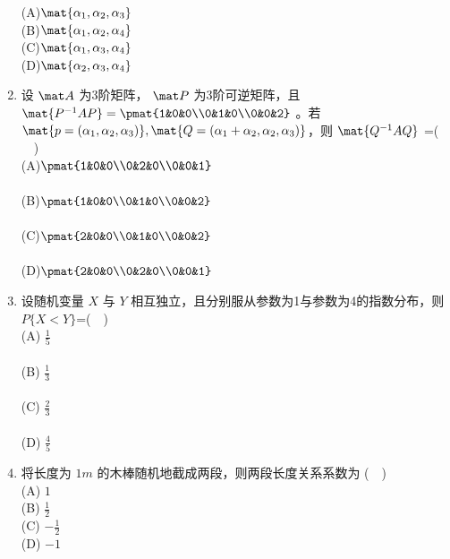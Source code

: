 \begin{enumerate}
(A)$\mat{ \alpha_1,\alpha_2,\alpha_3}$\\
(B)$\mat{ \alpha_1,\alpha_2,\alpha_4}$\\
(C)$\mat{ \alpha_1,\alpha_3,\alpha_4}$\\
(D)$\mat{ \alpha_2,\alpha_3,\alpha_4}$
\item 设 $\mat A$  为3阶矩阵， $\mat P$ 为3阶可逆矩阵，且 $\mat{P^{-1}AP}=\pmat{1&0&0\\0&1&0\\0&0&2}$  。若 $\mat{p=(\alpha_1,\alpha_2,\alpha_3)},\mat{Q=(\alpha_1+\alpha_2,\alpha_2,\alpha_3)}$，则 $\mat {Q^{-1}AQ}$ =($\quad$)\\
(A)$\pmat{1&0&0\\0&2&0\\0&0&1}$\\ \\
(B)$\pmat{1&0&0\\0&1&0\\0&0&2}$\\ \\
(C)$\pmat{2&0&0\\0&1&0\\0&0&2}$\\ \\
(D)$\pmat{2&0&0\\0&2&0\\0&0&1}$\\
\item 设随机变量 $X$ 与 $Y$ 相互独立，且分别服从参数为1与参数为4的指数分布，则  $P\{X<Y\}$=($\quad$)\\
(A) $\displaystyle \frac{1}{5}$\\ \\
(B) $ \displaystyle \frac{1}{3}$\\ \\
(C) $\displaystyle  \frac{2}{3}$\\ \\
(D) $\displaystyle \frac{4}{5}$
\item  将长度为 $1m$ 的木棒随机地截成两段，则两段长度关系系数为 ($\quad$)\\
(A) $1$\\
(B) $\displaystyle \frac{1}{2}$\\
(C) $\displaystyle -\frac{1}{2}$\\
(D) $-1$
\end{enumerate}
